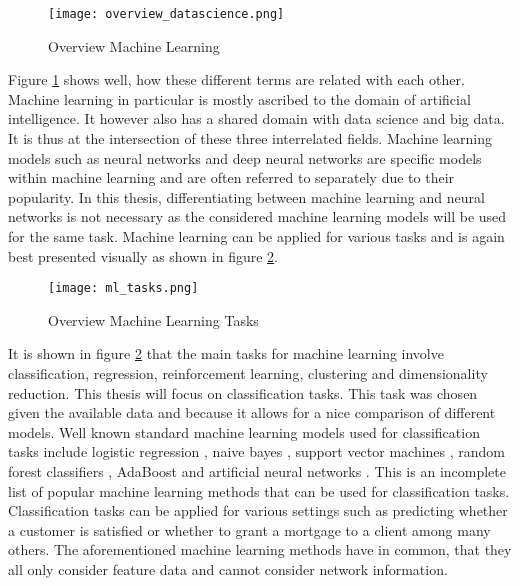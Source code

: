 	\begin{figure}[h]
		\centering
		\texttt{[image: overview\_datascience.png]}
		\caption{Overview Machine Learning}
		\citep{Frauenhofer2021}
		\label{fig:ml_overview}
	\end{figure} 

	\noindent Figure \ref{fig:ml_overview} shows well, how these different
	terms are related with each other. Machine learning in particular is
	mostly ascribed to the domain of artificial intelligence. It however also 
	has a shared domain with data science and big data. It is thus at the
	intersection of these three interrelated fields. Machine learning models 
	such as neural networks and deep neural networks are specific models within
	machine learning and are often referred to separately due to their
	popularity. In this thesis, differentiating between machine learning and
	neural networks is not necessary as the considered machine learning models
	will be used for the same task. Machine learning can be applied for various
	tasks and is again best presented visually as shown in figure 
	\ref{fig:ml_tasks}.

	\begin{figure}[h]
		\centering
		\texttt{[image: ml\_tasks.png]}
		\caption{Overview Machine Learning Tasks}
		\citep{Artisan2020}
		\label{fig:ml_tasks}
	\end{figure} 

	\noindent It is shown in figure \ref{fig:ml_tasks} that the main tasks for
	machine learning involve classification, regression, reinforcement
	learning, clustering and dimensionality reduction. This thesis will focus
	on classification tasks. This task was chosen given the available data and 
	because it allows for a nice comparison of different models. Well known 
	standard machine learning models used for classification tasks include 
	logistic regression \citep{cramer2002origins}, naive bayes 
	\citep{zhang2004bayes}, support vector machines 
	\citep{platt1999probabilistic}, random forest classifiers
	\citep{breiman2001random}, AdaBoost \citep{freund1997decision} and
	artificial neural networks \citep{mcculloch1943logical}. This is an
	incomplete list of popular machine learning methods that can be used for
	classification tasks. Classification tasks can be applied for various
	settings such as predicting whether a customer is satisfied or whether to
	grant a mortgage to a client among many others. The aforementioned machine
	learning methods have in common, that they all only consider feature data
	and cannot consider network information. \\


